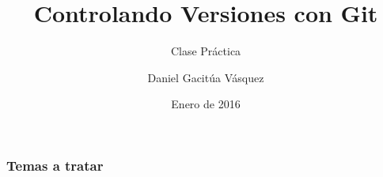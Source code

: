 \documentclass[t]{beamer}
\title{Controlando Versiones con Git}
\subtitle{Clase Práctica}
\author{Daniel Gacitúa Vásquez}
\institute{Comunidad GNU/Linux USACH}
\date{Enero de 2016}
\begin{document}
\begin{frame}
\titlepage
\end{frame}

\begin{frame}
\frametitle{Temas a tratar}
\tableofcontents
\end{frame}


\end{document}
